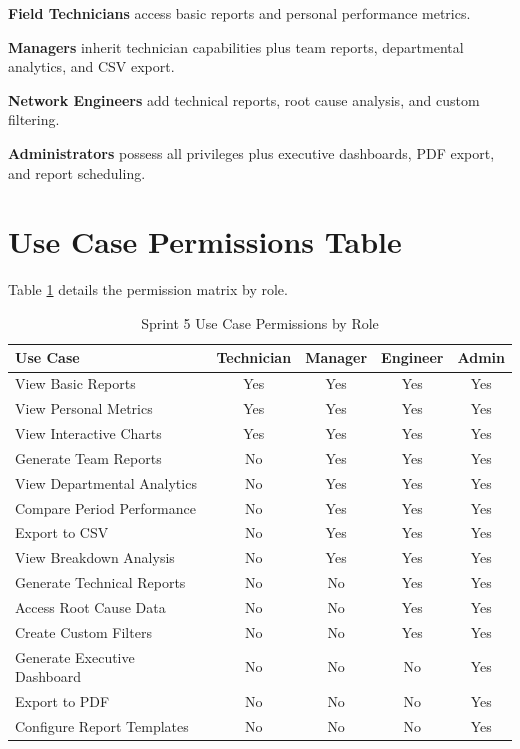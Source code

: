 \textbf{Field Technicians} access basic reports and personal performance metrics.

\textbf{Managers} inherit technician capabilities plus team reports, departmental analytics, and CSV export.

\textbf{Network Engineers} add technical reports, root cause analysis, and custom filtering.

\textbf{Administrators} possess all privileges plus executive dashboards, PDF export, and report scheduling.

\section{Use Case Permissions Table}

Table \ref{tab:sprint5-permissions} details the permission matrix by role.

\begin{table}[H]
\centering
\scriptsize
\caption{Sprint 5 Use Case Permissions by Role}
\label{tab:sprint5-permissions}
\begin{tabular}{|p{5.5cm}|c|c|c|c|}
\hline
\textbf{Use Case} & \textbf{Technician} & \textbf{Manager} & \textbf{Engineer} & \textbf{Admin} \\
\hline
View Basic Reports & Yes & Yes & Yes & Yes \\
\hline
View Personal Metrics & Yes & Yes & Yes & Yes \\
\hline
View Interactive Charts & Yes & Yes & Yes & Yes \\
\hline
Generate Team Reports & No & Yes & Yes & Yes \\
\hline
View Departmental Analytics & No & Yes & Yes & Yes \\
\hline
Compare Period Performance & No & Yes & Yes & Yes \\
\hline
Export to CSV & No & Yes & Yes & Yes \\
\hline
View Breakdown Analysis & No & Yes & Yes & Yes \\
\hline
Generate Technical Reports & No & No & Yes & Yes \\
\hline
Access Root Cause Data & No & No & Yes & Yes \\
\hline
Create Custom Filters & No & No & Yes & Yes \\
\hline
Generate Executive Dashboard & No & No & No & Yes \\
\hline
Export to PDF & No & No & No & Yes \\
\hline
Configure Report Templates & No & No & No & Yes \\
\hline
\end{tabular}
\end{table}

